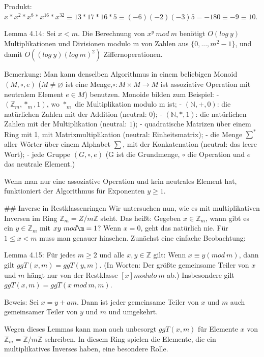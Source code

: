\documentclass[a4paper]{article}
\begin{document}
\begin{multicols}{3}
    Produkt: $x*x^2 *x^8 *x^{16} *x^{32} \equiv 13*17*16*5\equiv (-6)(-2)(-3)5 = -180\equiv -9\equiv 10$.

    Lemma 4.14: Sei $x<m$. Die Berechnung von $x^y\ mod\ m$ benötigt $O(log\ y)$ Multiplikationen und Divisionen modulo m von Zahlen aus $\{0,...,m^2-1\}$, und damit $O((log\ y)(log\ m)^2)$ Ziffernoperationen.

    Bemerkung: Man kann denselben Algorithmus in einem beliebigen Monoid $(M,\circ,e)$ ($M\not=\varnothing$ ist eine Menge,$\circ:M\times M \rightarrow M$ ist assoziative Operation mit neutralem Element $e\in M$) benutzen. Monoide bilden zum Beispiel:
    - $(\mathbb{Z}_m ,*_m,1)$, wo $*_m$ die Multiplikation modulo m ist;
    - $(\mathbb{N},+,0)$: die natürlichen Zahlen mit der Addition (neutral: $0$);
    - $(\mathbb{N},*,1)$: die natürlichen Zahlen mit der Multiplikation (neutral: $1$);
    - quadratische Matrizen über einem Ring mit $1$, mit Matrixmultiplikation (neutral: Einheitsmatrix);
    - die Menge $\sum^*$ aller Wörter über einem Alphabet $\sum$, mit der Konkatenation (neutral: das leere Wort);
    - jede Gruppe $(G,\circ,e)$ (G ist die Grundmenge, $\circ$ die Operation und $e$ das neutrale Element.)

    Wenn man nur eine assoziative Operation und kein neutrales Element hat, funktioniert der Algorithmus für Exponenten $y\geq 1$.

    ## Inverse in Restklassenringen
    Wir untersuchen nun, wie es mit multiplikativen Inversen im Ring $\mathbb{Z}_m =Z/m\mathbb{Z}$ steht. Das heißt: Gegeben $x\in\mathbb{Z}_m$, wann gibt es ein $y\in\mathbb{Z}_m$ mit $xy\ mod\m= 1$? Wenn $x=0$, geht das natürlich nie. Für $1\leq x<m$ muss man genauer hinsehen.
    Zunächst eine einfache Beobachtung:

    Lemma 4.15: Für jedes $m\geq 2$ und alle $x,y\in\mathbb{Z}$ gilt: Wenn $x\equiv y(mod\ m)$, dann gilt $ggT(x,m)=ggT(y,m)$. (In Worten: Der größte gemeinsame Teiler von $x$ und $m$ hängt nur von der Restklasse $[x] modulo\ m$ ab.) Insbesondere gilt $ggT(x,m) = ggT(x\ mod\ m,m)$.

    Beweis: Sei $x=y+am$. Dann ist jeder gemeinsame Teiler von $x$ und $m$ auch gemeinsamer Teiler von $y$ und $m$ und umgekehrt.

    Wegen dieses Lemmas kann man auch unbesorgt $ggT(x,m)$ für Elemente $x$ von $\mathbb{Z}_m =\mathbb{Z}/m\mathbb{Z}$ schreiben. In diesem Ring spielen die Elemente, die ein multiplikatives Inverses haben, eine besondere Rolle.


\end{multicols}
\end{document}
